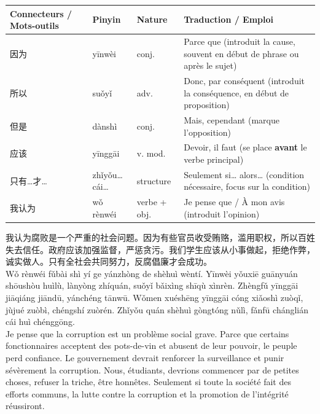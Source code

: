 \documentclass[11pt]{article}
\begin{document}
\begin{center}
\begin{tabularx}{\linewidth}{|X|X|X|X|}
\hline
\rowcolor{popblueL} \textbf{Connecteurs / Mots-outils} & \textbf{Pinyin} & \textbf{Nature} & \textbf{Traduction / Emploi} \\ \hline
因为 & yīnwèi & conj. & Parce que (introduit la cause, souvent en début de phrase ou après le sujet) \\ \hline
所以 & suǒyǐ & adv. & Donc, par conséquent (introduit la conséquence, en début de proposition) \\ \hline
但是 & dànshì & conj. & Mais, cependant (marque l'opposition) \\ \hline
应该 & yīnggāi & v. mod. & Devoir, il faut (se place \textbf{avant} le verbe principal) \\ \hline
只有…才… & zhǐyǒu…cái… & structure & Seulement si… alors… (condition nécessaire, focus sur la condition) \\ \hline
我认为 & wǒ rènwéi & verbe + obj. & Je pense que / À mon avis (introduit l'opinion) \\ \hline
\end{tabularx}
\end{center}

\begin{textebox}
我认为腐败是一个严重的社会问题。因为有些官员收受贿赂，滥用职权，所以百姓失去信任。政府应该加强监督，严惩贪污。我们学生应该从小事做起，拒绝作弊，诚实做人。只有全社会共同努力，反腐倡廉才会成功。
\\Wǒ rènwéi fǔbài shì yí ge yánzhòng de shèhuì wèntí. Yīnwèi yǒuxiē guānyuán shōushòu huìlù, lànyòng zhíquán, suǒyǐ bǎixìng shīqù xìnrèn. Zhèngfǔ yīnggāi jiāqiáng jiāndū, yánchéng tānwū. Wǒmen xuéshēng yīnggāi cóng xiǎoshì zuòqǐ, jùjué zuòbì, chéngshí zuòrén. Zhǐyǒu quán shèhuì gòngtóng nǔlì, fǎnfū chánglián cái huì chénggōng.
\\
Je pense que la corruption est un problème social grave. Parce que certains fonctionnaires acceptent des pots-de-vin et abusent de leur pouvoir, le peuple perd confiance. Le gouvernement devrait renforcer la surveillance et punir sévèrement la corruption. Nous, étudiants, devrions commencer par de petites choses, refuser la triche, être honnêtes. Seulement si toute la société fait des efforts communs, la lutte contre la corruption et la promotion de l'intégrité réussiront.
\end{textebox}
\end{document}
